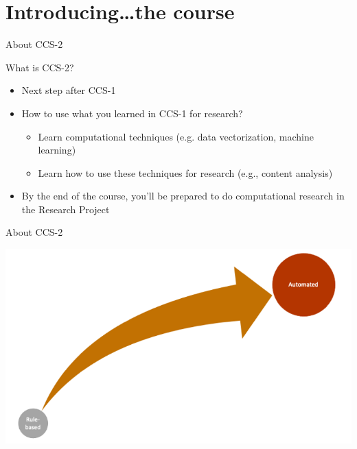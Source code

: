 \documentclass[handout]{beamer}
\begin{document}
\section{Introducing\ldots the course}


\begin{frame}{About CCS-2} 

What is CCS-2?
	\begin{itemize}
		\item Next step after CCS-1 %
		\item How to use what you learned in CCS-1 for research?
		\begin{itemize}
			\item Learn computational techniques (e.g. data vectorization, machine learning)
			\item Learn how to use these techniques for research (e.g., content analysis)
		\end{itemize}
		\item By the end of the course, you'll be prepared to do computational research in the Research Project
	\end{itemize}
	
\end{frame}


\begin{frame}{About CCS-2}
	
	\begin{center}
		\includegraphics[width=\linewidth,height=\textheight,keepaspectratio]{../pictures/Roadmap.png} 
	\end{center}
	
\end{frame}
\end{document}
